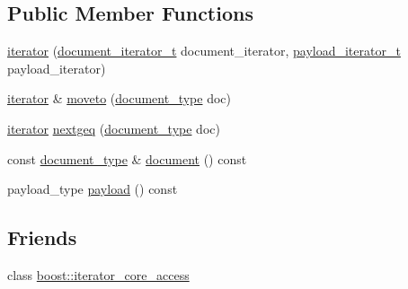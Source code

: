 \subsection*{Public Member Functions}
\begin{DoxyCompactItemize}
\item 
\mbox{\hyperlink{classirk_1_1index_1_1block__posting__list__view_1_1iterator_a72038769859b9c21965abab4736e1e9c}{iterator}} (\mbox{\hyperlink{classirk_1_1index_1_1block__posting__list__view_a5b6c3f910a1bd819ff3efa0a619e32a0}{document\+\_\+iterator\+\_\+t}} document\+\_\+iterator, \mbox{\hyperlink{classirk_1_1index_1_1block__posting__list__view_ad7beed21d25c7cb3b2b389c28022be12}{payload\+\_\+iterator\+\_\+t}} payload\+\_\+iterator)
\item 
\mbox{\hyperlink{classirk_1_1index_1_1block__posting__list__view_1_1iterator}{iterator}} \& \mbox{\hyperlink{classirk_1_1index_1_1block__posting__list__view_1_1iterator_a35c46c592f4f06ae24945bf6881efc2a}{moveto}} (\mbox{\hyperlink{classirk_1_1index_1_1block__posting__list__view_a4a778116d22c9cf347f38da132ca0900}{document\+\_\+type}} doc)
\item 
\mbox{\hyperlink{classirk_1_1index_1_1block__posting__list__view_1_1iterator}{iterator}} \mbox{\hyperlink{classirk_1_1index_1_1block__posting__list__view_1_1iterator_ab330da1b4a727e2afadb5469fc80e4f0}{nextgeq}} (\mbox{\hyperlink{classirk_1_1index_1_1block__posting__list__view_a4a778116d22c9cf347f38da132ca0900}{document\+\_\+type}} doc)
\item 
const \mbox{\hyperlink{classirk_1_1index_1_1block__posting__list__view_a4a778116d22c9cf347f38da132ca0900}{document\+\_\+type}} \& \mbox{\hyperlink{classirk_1_1index_1_1block__posting__list__view_1_1iterator_a6dfbadd2661f2f37723800b4acc7c7ce}{document}} () const
\item 
payload\+\_\+type \mbox{\hyperlink{classirk_1_1index_1_1block__posting__list__view_1_1iterator_a8bf0051cfe9dfef27c3a7a627ad51987}{payload}} () const
\end{DoxyCompactItemize}
\subsection*{Friends}
\begin{DoxyCompactItemize}
\item 
class \mbox{\hyperlink{classirk_1_1index_1_1block__posting__list__view_1_1iterator_ac09f73e325921cc50ebcd96bed0f8096}{boost\+::iterator\+\_\+core\+\_\+access}}
\end{DoxyCompactItemize}


